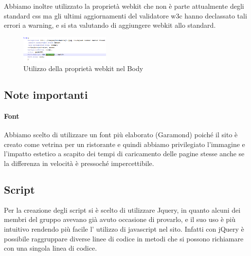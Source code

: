Abbiamo inoltre utilizzato la proprietà webkit che non è parte attualmente degli standard css ma gli ultimi aggiornamenti del validatore w3c hanno declassato tali errori a warning, e si sta valutando di aggiungere webkit allo standard.

\begin{figure}[H]
		\centering \includegraphics[width=0.4\textwidth]{images/webkit.png}
		\caption{Utilizzo della proprietà webkit nel Body}
\end{figure}

\subsection{Note importanti}

\paragraph{Font}

Abbiamo scelto di utilizzare un font più elaborato (Garamond) poiché il sito è creato come vetrina per un ristorante e quindi abbiamo privilegiato l’immagine e l’impatto estetico a scapito dei tempi di caricamento delle pagine stesse anche se la differenza in velocità è pressoché impercettibile.

\subsection{Script}
Per la creazione degli script si è scelto di utilizzare Jquery, in quanto alcuni dei membri del gruppo avevano già avuto occasione di provarlo, e il suo uso è più intuitivo rendendo più facile l' utilizzo di javascript nel sito. Infatti con jQuery è possibile raggruppare diverse linee di codice in metodi che si possono richiamare con una singola linea di codice.
